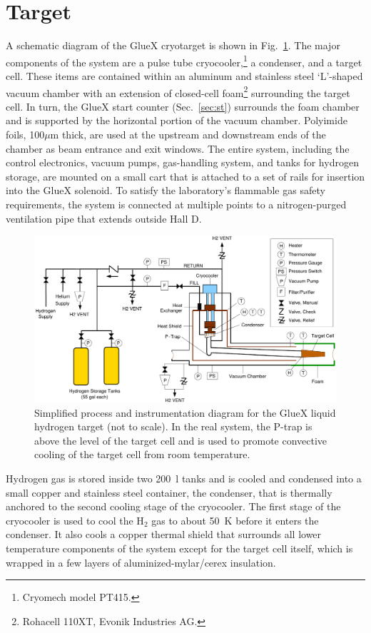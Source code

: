 \section[Target (C. Keith)]{Target \label{sec:target} }
A schematic diagram of the GlueX cryotarget is shown in Fig.~\ref{fig:Target}.  
The major components of the system are a pulse tube cryocooler,\footnote{Cryomech model PT415.}
a condenser, and a target cell.  These items are contained within
an aluminum and stainless steel `L'-shaped vacuum chamber
with an extension of closed-cell foam\footnote{Rohacell 110XT, Evonik Industries AG.}
surrounding the target cell.
In turn, the GlueX start counter (Sec.~\ref{sec:st}) surrounds the
foam chamber and is supported by the horizontal portion of the vacuum chamber.
Polyimide foils, 100$\mu$m thick, are used at the upstream and downstream ends of the
chamber as beam entrance and exit windows.
The entire system, including the control electronics, vacuum pumps,
gas-handling system, and tanks for hydrogen
storage, are mounted on a small cart that is attached to a set of rails for
insertion into the GlueX solenoid.  To satisfy the laboratory's flammable gas safety requirements,
the system is connected at multiple points to a nitrogen-purged ventilation pipe that
extends outside Hall D. 
\begin{figure}
\begin{center}
\includegraphics[width=5in]{figures/TargetSchematic2.pdf}
\end{center}
\caption{Simplified process and instrumentation diagram for the GlueX liquid hydrogen target (not to scale).
In the real system, the P-trap is above the level of the target cell and is used to
promote convective cooling of the target cell from room temperature.}
\label{fig:Target}
\end{figure}

Hydrogen gas is stored inside two 200~l tanks and
is cooled and condensed into a small copper and stainless steel container,
the condenser, that is thermally anchored to the second cooling stage of the cryocooler. 
The first stage of the cryocooler is used to
cool the H$_2$ gas to about 50~K before it enters the condenser.
It also cools a copper thermal shield that surrounds all
lower temperature components of the system except for the
target cell itself, which is wrapped in a few layers of aluminized-mylar/cerex insulation.

